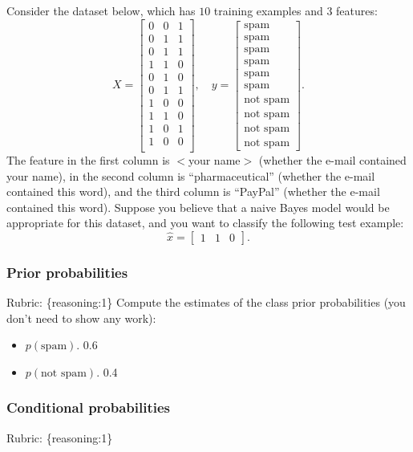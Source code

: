 \documentclass{article}
\def\rubric#1{\gre{Rubric: \{#1\}}}{}
\def\blu#1{{\color{blu}#1}}
\def\gre#1{{\color{gre}#1}}
\def\red#1{{\color{red}#1}}
\def\items#1{\begin{itemize}#1\end{itemize}}
\begin{document}
Consider the dataset below, which has $10$ training examples and $3$ features:
\[
X = \begin{bmatrix}0 & 0 & 1\\0 & 1 & 1\\ 0 & 1 & 1\\ 1 & 1 & 0\\0 & 1 & 0\\0 & 1 & 1\\1 & 0 & 0\\1 & 1 & 0\\1 & 0 & 1\\1 & 0 & 0\\\end{bmatrix}, \quad y = \begin{bmatrix}\text{spam}\\\text{spam}\\\text{spam}\\\text{spam}\\\text{spam}\\\text{spam}\\\text{not spam}\\\text{not spam}\\\text{not spam}\\\text{not spam}\end{bmatrix}.
\]
The feature in the first column is $<$your name$>$ (whether the e-mail contained your name), in the second column is ``pharmaceutical'' (whether the e-mail contained this word), and the third column is ``PayPal'' (whether the e-mail contained this word).
Suppose you believe that a naive Bayes model would be appropriate for this dataset, and you want to classify the following test example:
\[
\hat{x} = \begin{bmatrix}1 & 1 & 0\end{bmatrix}.
\]

\subsubsection{Prior probabilities}
\rubric{reasoning:1}
\blu{Compute the estimates of the class prior probabilities} (you don't need to show any work):
\items{
\item$ p(\text{spam})$. \red{0.6}
\item $p(\text{not spam})$. \red{0.4}
}

\subsubsection{Conditional probabilities}
\rubric{reasoning:1}
\end{document}
